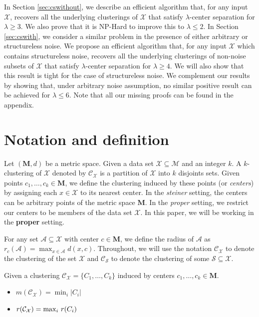 \documentclass[orivec]{llncs}
\newcommand{\mc}{\mathcal}
\newcommand{\mb}{\mathbf}
\begin{document}
In Section \ref{sec:cswithout}, we describe an efficient algorithm that, for any input $\mc X$, recovers all the underlying clusterings of $\mc X$ that satisfy $\lambda$-center separation for $\lambda \geq 3$. We also prove that it is NP-Hard to improve this to $\lambda \leq 2$. In Section \ref{sec:cswith}, we consider a similar problem in the presence of either arbitrary or structureless noise. We propose an efficient algorithm that, for any input $\mc X$ which contains structureless noise, recovers all the underlying clusterings of non-noise subsets of $\mc X$ that satisfy $\lambda$-center separation for $\lambda \geq 4$. We will also show that this result is tight for the case of structureless noise. We complement our results by showing that, under arbitrary noise assumption, no similar positive result can be achieved for $\lambda \leq 6$. Note that all our missing proofs can be found in the appendix.

\section{Notation and definition}
\label{sec:Notation}
Let $(\mb M, d)$ be a metric space. Given a data set $\mc X \subseteq \mc M$ and an integer $k$. A $k$-clustering of $\mc X$ denoted by $\mc C_{\mc X}$ is a partition of $\mc X$ into $k$ disjoints sets. Given points $c_1, \ldots, c_k \in \mb M$, we define the clustering induced by these points (or {\it centers}) by assigning each $x \in \mc X$ to its nearest center. In the {\it steiner} setting, the centers can be arbitrary points of the metric space $\mb M$. In the {\it proper} setting, we restrict our centers to be members of the data set $\mc X$. In this paper, we will be working in the {\bf proper} setting.

For any set $\mc A\subseteq \mc X$ with center $c\in \mb M$, we define the radius of $\mc A$ as $r_c(\mc A) = \max_{x \in \mc A} d(x, c)$. Throughout, we will use the notation $\mc C_{\mc X}$ to denote the clustering of the set $\mc X$ and $\mc C_{\mc S}$ to denote the clustering of some $\mc S\subseteq \mc X$. 

\begin{definition}[$r(\mc C_{\mc X})$ , $m(\mc C_{\mc X})$] Given a clustering $\mc C_{\mc X} = \{C_1, \ldots, C_k\}$ induced by centers $c_1, \ldots, c_k \in \mb M$. 
\begin{itemize}[nolistsep, noitemsep]
\item $m(\mc{C}_{\mc{X}}) = \min_i |C_i|$
\item $r(\mc{C}_{\mc{X}}) = \max_i \thinspace r(C_i)$
\end{itemize}
\end{definition}
\end{document}
